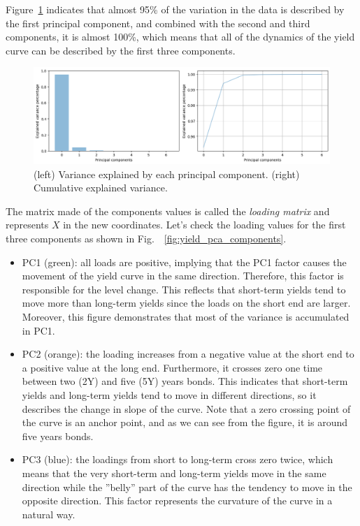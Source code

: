 \begin{enumerate}
Figure~\ref{fig:pca_explained_variance} indicates that almost 95\% of the variation in the data is described by the first principal component, and combined with the second and third components, it is almost 100\%, which means that all of the dynamics of the yield curve can be described by the first three components.

\begin{figure}[hbtp]
	\centering
	\includegraphics[width=0.8\linewidth]{figures/pca_explained_variance}
	\caption{(left) Variance explained by each principal component. (right) Cumulative explained variance.}
	\label{fig:pca_explained_variance}
\end{figure}

The matrix made of the components values is called the \emph{loading matrix} and represents $X$ in the new coordinates.
Let's check the loading values for the first three components as shown in Fig.~~\ref{fig:yield_pca_components}.
 
\begin{itemize}
\item PC1 (green): all loads are positive, implying that the PC1 factor causes the movement of the yield curve in the same direction. Therefore, this factor is responsible for the level change. This reflects that short-term yields tend to move more than long-term yields since the loads on the short end are larger. Moreover, this figure demonstrates that most of the variance is accumulated in PC1.
\item PC2 (orange): the loading increases from a negative value at the short end to a positive value at the long end. Furthermore, it crosses zero one time between two (2Y) and five (5Y) years bonds. This indicates that short-term yields and long-term yields tend to move in different directions, so it describes the change in slope of the curve. Note that a zero crossing point of the curve is an anchor point, and as we can see from the figure, it is around five years bonds.
\item PC3 (blue): the loadings from short to long-term cross zero twice, which means that the very short-term and long-term yields move in the same direction while the ”belly” part of the curve has the tendency to move in the opposite direction. This factor represents the curvature of the curve in a natural way.
\end{itemize}
	

\end{enumerate}

